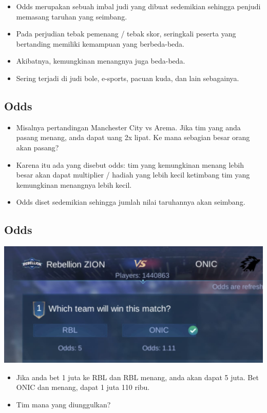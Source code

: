 \documentclass[
  letterpaper,
  DIV=11,
  numbers=noendperiod]{scrartcl}
\begin{document}
\begin{itemize}
\item
  Odds merupakan sebuah imbal judi yang dibuat sedemikian sehingga
  penjudi memasang taruhan yang seimbang.
\item
  Pada perjudian tebak pemenang / tebak skor, seringkali peserta yang
  bertanding memiliki kemampuan yang berbeda-beda.
\item
  Akibatnya, kemungkinan menangnya juga beda-beda.
\item
  Sering terjadi di judi bole, e-sports, pacuan kuda, dan lain
  sebagainya.
\end{itemize}

\hypertarget{odds-1}{%
\subsection{Odds}\label{odds-1}}

\begin{itemize}
\item
  Misalnya pertandingan Manchester City vs Arema. Jika tim yang anda
  pasang menang, anda dapat uang 2x lipat. Ke mana sebagian besar orang
  akan pasang?
\item
  Karena itu ada yang disebut odds: tim yang kemungkinan menang lebih
  besar akan dapat multiplier / hadiah yang lebih kecil ketimbang tim
  yang kemungkinan menangnya lebih kecil.
\item
  Odds diset sedemikian sehingga jumlah nilai taruhannya akan seimbang.
\end{itemize}

\hypertarget{odds-2}{%
\subsection{Odds}\label{odds-2}}

\includegraphics{bet.jpg}

\begin{itemize}
\item
  Jika anda bet 1 juta ke RBL dan RBL menang, anda akan dapat 5 juta.
  Bet ONIC dan menang, dapat 1 juta 110 ribu.
\item
  Tim mana yang diunggulkan?
\end{itemize}
\end{document}
